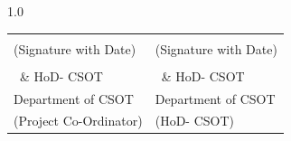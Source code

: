 \vspace{0.5cm}

\begin{spacing}{1.0}
	\begin{tabular}{p{7.5cm} p{7.5cm}}
		& \\
		(Signature with Date) & (Signature with Date)\\
		\textbf{\theProjectcoordinator} & \textbf{\thehod}\\
		\ProjectcoordinatorDesignation\ \& HoD- CSOT & \ProjectcoordinatorDesignation\ \& HoD- CSOT\\
		Department of CSOT & Department of CSOT\\
		(Project Co-Ordinator) & (HoD- CSOT)\\
	\end{tabular}
\end{spacing}